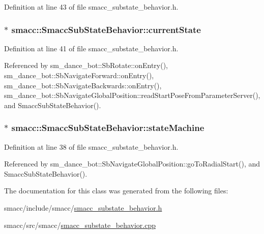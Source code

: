 Definition at line 43 of file smacc\+\_\+substate\+\_\+behavior.\+h.

\subsubsection[{\texorpdfstring{current\+State}{currentState}}]{$\ast$ smacc\+::\+Smacc\+Sub\+State\+Behavior\+::current\+State}\hypertarget{classsmacc_1_1SmaccSubStateBehavior_a62e2b9da4a446f09396d0b4c01659b88}{}\label{classsmacc_1_1SmaccSubStateBehavior_a62e2b9da4a446f09396d0b4c01659b88}


Definition at line 41 of file smacc\+\_\+substate\+\_\+behavior.\+h.



Referenced by sm\+\_\+dance\+\_\+bot\+::\+Sb\+Rotate\+::on\+Entry(), sm\+\_\+dance\+\_\+bot\+::\+Sb\+Navigate\+Forward\+::on\+Entry(), sm\+\_\+dance\+\_\+bot\+::\+Sb\+Navigate\+Backwards\+::on\+Entry(), sm\+\_\+dance\+\_\+bot\+::\+Sb\+Navigate\+Global\+Position\+::read\+Start\+Pose\+From\+Parameter\+Server(), and Smacc\+Sub\+State\+Behavior().

\subsubsection[{\texorpdfstring{state\+Machine}{stateMachine}}]{$\ast$ smacc\+::\+Smacc\+Sub\+State\+Behavior\+::state\+Machine}\hypertarget{classsmacc_1_1SmaccSubStateBehavior_ae3ff8a316bdd4bc5b7fee59d19464609}{}\label{classsmacc_1_1SmaccSubStateBehavior_ae3ff8a316bdd4bc5b7fee59d19464609}


Definition at line 38 of file smacc\+\_\+substate\+\_\+behavior.\+h.



Referenced by sm\+\_\+dance\+\_\+bot\+::\+Sb\+Navigate\+Global\+Position\+::go\+To\+Radial\+Start(), and Smacc\+Sub\+State\+Behavior().



The documentation for this class was generated from the following files\+:\begin{DoxyCompactItemize}
\item 
smacc/include/smacc/\hyperlink{smacc__substate__behavior_8h}{smacc\+\_\+substate\+\_\+behavior.\+h}\item 
smacc/src/smacc/\hyperlink{smacc__substate__behavior_8cpp}{smacc\+\_\+substate\+\_\+behavior.\+cpp}\end{DoxyCompactItemize}
